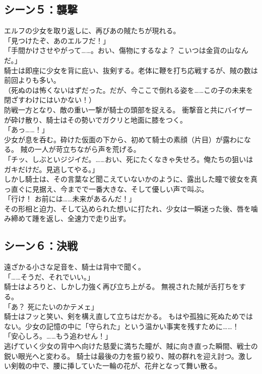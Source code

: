 \subsection{シーン５：襲撃}
エルフの少女を取り返しに、再びあの賊たちが現れる。
\\「見つけたぞ、あのエルフだ！」
\\「手間かけさせやがって……。おい、傷物にするなよ？ こいつは金貨の山なんだ。」\\
騎士は即座に少女を背に庇い、抜剣する。老体に鞭を打ち応戦するが、賊の数は前回よりも多い。
\\（死ぬのは怖くないはずだった。だが、今ここで倒れる姿を……この子の未来を閉ざすわけにはいかない！）\\
防戦一方となり、敵の重い一撃が騎士の頭部を捉える。
衝撃音と共にバイザーが砕け散り、騎士はその勢いでガクリと地面に膝をつく。
\\「あっ……！」\\
少女が息を呑む。砕けた仮面の下から、初めて騎士の素顔（片目）が露わになる。
賊の一人が苛立ちながら声を荒げる。
\\「チッ、しぶといジジイだ。……おい、死にたくなきゃ失せろ。俺たちの狙いはガキだけだ。見逃してやる。」\\
しかし騎士は、その言葉など聞こえていないかのように、露出した瞳で彼女を真っ直ぐに見据え、今までで一番大きな、そして優しい声で叫ぶ。
\\「行け！ お前には……未来があるんだ！」\\
その形相と迫力、そして込められた想いに打たれ、少女は一瞬迷った後、唇を噛み締めて踵を返し、全速力で走り出す。

\subsection{シーン６：決戦}
遠ざかる小さな足音を、騎士は背中で聞く。
\\「……そうだ、それでいい。」\\
騎士はよろりと、しかし力強く再び立ち上がる。
無視された賊が舌打ちをする。
\\「あ？ 死にたいのかテメェ」\\
騎士はフッと笑い、剣を構え直して立ちはだかる。
もはや孤独に死ぬためではない。少女の記憶の中に「守られた」という温かい事実を残すために……！
\\「安心しろ。……もう追わせん！」\\
逃げていく少女の背中へ向けた慈愛に満ちた瞳が、賊に向き直った瞬間、戦士の鋭い眼光へと変わる。
騎士は最後の力を振り絞り、賊の群れを迎え討つ。激しい剣戟の中で、腰に挿していた一輪の花が、花弁となって舞い散る。

